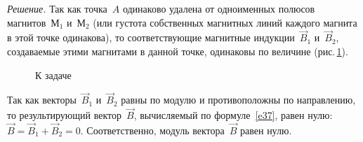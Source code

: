 \documentclass[main.tex]{subfiles}
\begin{document}
\noindent\emph{Решение.} Так как точка~$A$ одинаково удалена от одноименных полюсов магнитов~$\text{М}_1$ и~$\text{М}_2$ (или густота собственных магнитных линий каждого магнита в этой точке одинакова), то соответствующие магнитные индукции~$\vec B_1$ и~$\vec B_2$, создаваемые этими магнитами в данной точке, одинаковы по величине (рис.\,\ref{fig:p144}).

    \begin{figure}[H]
    \centering

\caption{К задаче}
\label{fig:p144}
\end{figure}

Так как векторы~$\vec B_1$ и~$\vec B_2$ равны по модулю и противоположны по направлению, то результирующий вектор~$\vec B$, вычисляемый по формуле~\eqref{e37}, равен нулю: $\vec B=\vec B_1+\vec B_2=0$. Соответственно, модуль вектора~$\vec B$ равен нулю.  














 
\end{document}
